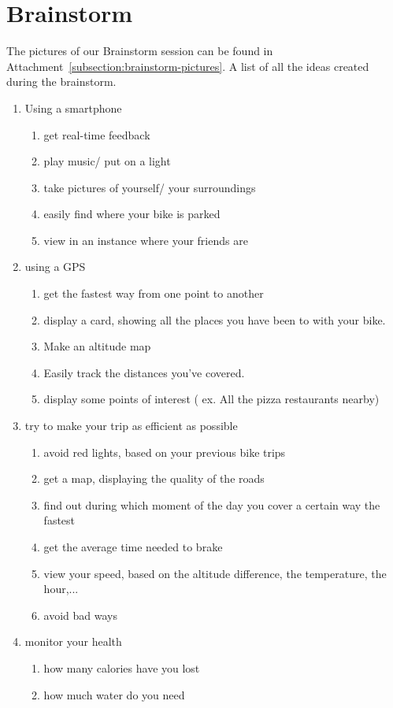 \section{Brainstorm}
The pictures of our Brainstorm session can be found in Attachment~\ref{subsection:brainstorm-pictures}.
A list of all the ideas created during the brainstorm.
\begin{enumerate}
 \item Using a smartphone
 \begin{enumerate}
 \item get real-time feedback
 \item play music/ put on a light
 \item take pictures of yourself/ your surroundings 
 \item easily find where your bike is parked
 \item view in an instance where your friends are
 \end{enumerate}
 \item using a GPS
  \begin{enumerate}
  \item get the fastest way from one point to another
  \item display a card, showing all the places you have been to with your bike. 
  \item Make an altitude map
  \item Easily track the distances you've covered.
  \item display some points of interest ( ex. All the pizza restaurants nearby)
  \end{enumerate}
  \item try to make your trip as efficient as possible
  \begin{enumerate}
  \item avoid red lights, based on your previous bike trips
  \item get a map, displaying the quality of the roads 
  \item find out during which moment of the day you cover a certain way the fastest
  \item get the average time needed to brake
  \item view your speed, based on the altitude difference, the temperature, the hour,...
  \item avoid bad ways 
  \end{enumerate}
  \item monitor your health
  \begin{enumerate}
   \item how many calories have you lost
    \item how much water do you need 
  \end{enumerate}
\end{enumerate}


